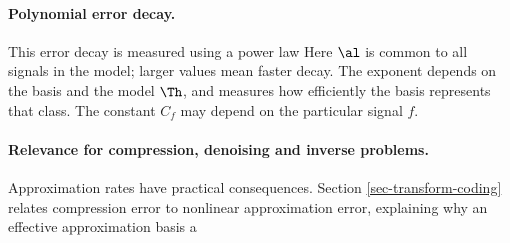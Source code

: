  
\paragraph{Polynomial error decay.}

This error decay is measured using a power law
Here $\al$ is common to all signals in the model; larger values mean faster decay. The exponent depends on the basis and the model $\Th$, and measures how efficiently the basis represents that class. The constant $C_f$ may depend on the particular signal $f$.

  
\paragraph{Relevance for compression, denoising and inverse problems.}

Approximation rates have practical consequences. Section \ref{sec-transform-coding} relates compression error to nonlinear approximation error, explaining why an effective approximation basis a
